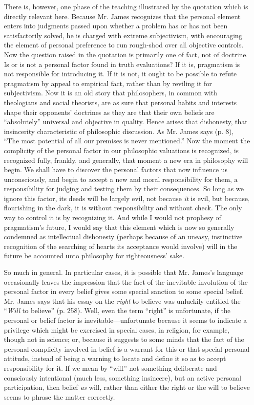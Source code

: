 \documentclass[12pt]{article}
\begin{document}
There is, however, one phase of the teaching illustrated by the
quotation which is directly relevant here. Because Mr. James
recognizes that the personal element enters into judgments passed upon
whether a problem has or has not been satisfactorily solved, he is
charged with extreme subjectivism, with encouraging the element of
personal preference to run rough-shod over all objective controls. Now
the question raised in the quotation is primarily one of fact, not of
doctrine. Is or is not a personal factor found in truth evaluations?
If it is, pragmatism is not responsible for introducing it. If it is
not, it ought to be possible to refute pragmatism by appeal to
empirical fact, rather than by reviling it for subjectivism. Now it is
an old story that philosophers, in common with theologians and social
theorists, are as sure that personal habits and interests shape their
opponents' doctrines as they are that their own beliefs are
``absolutely'' universal and objective in quality. Hence arises that
dishonesty, that insincerity characteristic of philosophic discussion.
As Mr. James says (p. 8), ``The most potential of all our premises is
never mentioned.'' Now the moment the complicity of the personal
factor in our philosophic valuations is recognized, is recognized
fully, frankly, and generally, that moment a new era in philosophy
will begin. We shall have to discover the personal factors that now
influence us unconsciously, and begin to accept a new and moral
responsibility for them, a responsibility for judging and testing them
by their consequences. So long as we ignore this factor, its deeds
will be largely evil, not because \emph{it} is evil, but because,
flourishing in the dark, it is without responsibility and without
check. The only way to control it is by recognizing it. And while I
would not prophesy of pragmatism's future, I would say that this
element which is now so generally condemned as intellectual dishonesty
(perhaps because of an uneasy, instinctive recognition of the
searching of hearts its acceptance would involve) will in the future
be accounted unto philosophy for righteousness' sake.


So much in general. In particular cases, it is possible that Mr.
James's language occasionally leaves the impression that the fact of
the inevitable involution of the personal factor in every belief gives
some special sanction to some special belief. Mr. James says that his
essay on the \emph{right} to believe was unluckily entitled the ``\emph{Will} to
believe'' (p. 258). Well, even the term ``right'' is unfortunate, if the
personal or belief factor is inevitable---unfortunate because it seems
to indicate a privilege which might be exercised in special cases, in
religion, for example, though not in science; or, because it suggests
to some minds that the fact of the personal complicity involved in
belief is a warrant for this or that special personal attitude,
instead of being a warning to locate and define it so as to accept
responsibility for it. If we mean by ``will'' not something deliberate
and consciously intentional (much less, something insincere), but an
active personal participation, then belief \emph{as} will, rather than
either the right or the will to believe seems to phrase the matter
correctly.
\end{document}
